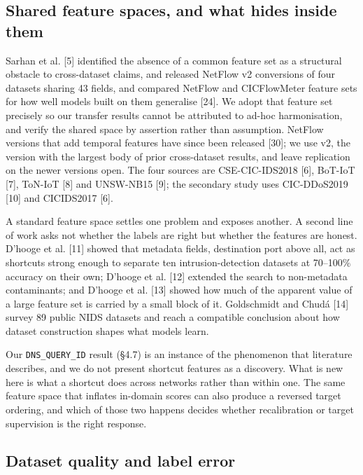 \documentclass[11pt,a4paper]{article}
\begin{document}
\subsection{Shared feature spaces, and what hides inside them}

Sarhan et al. [5] identified the absence of a common feature set as a structural obstacle to cross-dataset claims, and released NetFlow v2 conversions of four datasets sharing 43 fields, and compared NetFlow and CICFlowMeter feature sets for how well models built on them generalise [24]. We adopt that feature set precisely so our transfer results cannot be attributed to ad-hoc harmonisation, and verify the shared space by assertion rather than assumption. NetFlow versions that add temporal features have since been released [30]; we use v2, the version with the largest body of prior cross-dataset results, and leave replication on the newer versions open. The four sources are CSE-CIC-IDS2018 [6], BoT-IoT [7], ToN-IoT [8] and UNSW-NB15 [9]; the secondary study uses CIC-DDoS2019 [10] and CICIDS2017 [6].

A standard feature space settles one problem and exposes another. A second line of work asks not whether the labels are right but whether the features are honest. D'hooge et al. [11] showed that metadata fields, destination port above all, act as shortcuts strong enough to separate ten intrusion-detection datasets at 70--100\% accuracy on their own; D'hooge et al. [12] extended the search to non-metadata contaminants; and D'hooge et al. [13] showed how much of the apparent value of a large feature set is carried by a small block of it. Goldschmidt and Chudá [14] survey 89 public NIDS datasets and reach a compatible conclusion about how dataset construction shapes what models learn.

Our \texttt{DNS\_QUERY\_ID} result (§4.7) is an instance of the phenomenon that literature describes, and we do not present shortcut features as a discovery. What is new here is what a shortcut does across networks rather than within one. The same feature space that inflates in-domain scores can also produce a reversed target ordering, and which of those two happens decides whether recalibration or target supervision is the right response.

\subsection{Dataset quality and label error}
\end{document}
